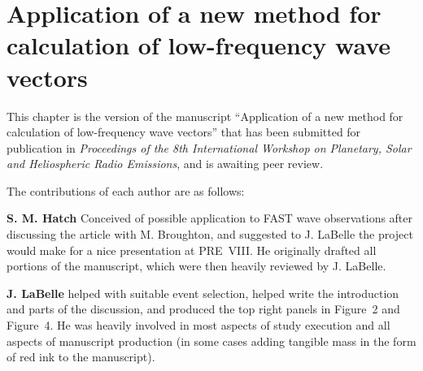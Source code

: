 
\chapter{Application of a new method for calculation of low-frequency
  wave vectors}
\label{chp:5}

This chapter is the version of the manuscript ``Application of a new
method for calculation of low-frequency wave vectors'' that has been
submitted for publication in \textsl{Proceedings of the 8th
  International Workshop on Planetary, Solar and Heliospheric Radio
  Emissions}, and is awaiting peer review.

The contributions of each author are as follows:

\textbf{S. M. Hatch} Conceived of possible application to FAST \Alf
wave observations after discussing the article with M. Broughton, and
suggested to J. LaBelle the project would make for a nice presentation
at PRE~VIII. He originally drafted all portions of the manuscript,
which were then heavily reviewed by J. LaBelle.

\textbf{J. LaBelle} helped with suitable event selection, helped write
the introduction and parts of the discussion, and produced the top
right panels in Figure~2 and Figure~4. He was heavily involved in most
aspects of study execution and all aspects of manuscript production
(in some cases adding tangible mass in the form of red ink to the
manuscript).

